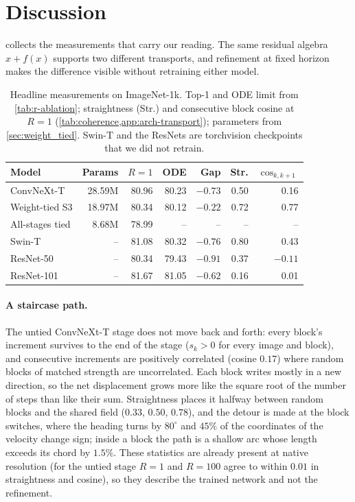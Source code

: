 \section{Discussion}
\label{sec:discussion}

 collects the measurements that carry our reading.
The same residual algebra $x+f(x)$ supports two different transports, and refinement
at fixed horizon makes the difference visible without retraining either model.

\begin{table}[t]
    \centering
    \caption{Headline measurements on ImageNet-1k.
    Top-1 and ODE limit from \cref{tab:r-ablation}; straightness (Str.) and consecutive
    block cosine at $R{=}1$ (\cref{tab:coherence,app:arch-transport}); parameters from
    \cref{sec:weight_tied}.
    Swin-T and the ResNets are torchvision checkpoints that we did not retrain.}
    \label{tab:headline}
    \small
    \setlength{\tabcolsep}{2.6pt}
    \begin{tabular}{lrrrrrr}
        \toprule
        Model & Params & $R{=}1$ & ODE & Gap & Str. & $\cos_{k,k+1}$ \\
        \midrule
        ConvNeXt-T         & 28.59M & 80.96 & 80.23 & $-0.73$ & 0.50 & 0.16 \\
        Weight-tied S3     & 18.97M & 80.34 & 80.12 & $-0.22$ & 0.72 & 0.77 \\
        All-stages tied    & 8.68M  & 78.99 & --    & --      & --   & --   \\
        Swin-T             & --     & 81.08 & 80.32 & $-0.76$ & 0.80 & 0.43 \\
        ResNet-50          & --     & 80.34 & 79.43 & $-0.91$ & 0.37 & $-0.11$ \\
        ResNet-101         & --     & 81.67 & 81.05 & $-0.62$ & 0.16 & 0.01 \\
        \bottomrule
    \end{tabular}
\end{table}

\paragraph{A staircase path.}
The untied ConvNeXt-T stage does not move back and forth: every block's increment survives to the end of the stage ($s_k>0$ for every image and
block), and consecutive increments are positively correlated (cosine $0.17$) where
random blocks of matched strength are uncorrelated.
Each block writes mostly in a new direction, so the net displacement grows more like
the square root of the number of steps than like their sum.
Straightness places it halfway between random blocks and the shared field
($0.33$, $0.50$, $0.78$), and the detour is made at the block switches, where the
heading turns by $80^\circ$ and $45\%$ of the coordinates of the velocity change sign;
inside a block the path is a shallow arc whose length exceeds its chord by $1.5\%$.
These statistics are already present at native resolution (for the untied stage
$R{=}1$ and $R{=}100$ agree to within $0.01$ in straightness and cosine), so they describe the trained
network and not the refinement.

